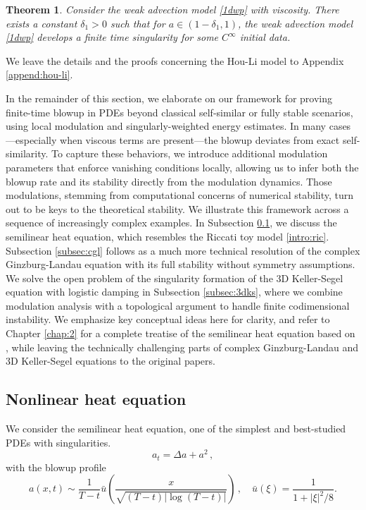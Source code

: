 \documentclass[12pt]{caltech_thesis}
\newtheorem{theorem}{Theorem}[section]
\numberwithin{equation}{section}
\begin{document}
\begin{theorem}
Consider the weak advection model \eqref{1dwp} with viscosity. There exists a constant $\delta_1>0$ such that for $a\in(1-\delta_1,1)$, the weak advection model \eqref{1dwp} develops a finite time singularity for some $C^{\infty}$ initial data.
\end{theorem}
We leave the details and the proofs concerning the Hou-Li model to Appendix \ref{append:hou-li}.

In the remainder of this section, we elaborate on our framework for proving finite-time blowup in PDEs beyond classical self-similar or fully stable scenarios, using local modulation and singularly-weighted energy estimates. In many cases—especially when viscous terms are present—the blowup deviates from exact self-similarity. To capture these behaviors, we introduce additional modulation parameters that enforce vanishing conditions locally, allowing us to infer both the blowup rate and its stability directly from the modulation dynamics. Those modulations, stemming from computational concerns of numerical stability, turn out to be keys to the theoretical stability. 
We illustrate this framework across a sequence of increasingly complex examples. In Subsection \ref{subsec:nlh}, we discuss the semilinear heat equation, which resembles the Riccati toy model \eqref{intro:ric}. Subsection \ref{subsec:cgl} follows as a much more technical resolution of the complex Ginzburg-Landau equation with its full stability without symmetry assumptions. We solve the open problem of the singularity formation of the 3D Keller-Segel equation with logistic damping in Subsection \ref{subsec:3dks}, where we combine modulation analysis with a topological argument to handle finite codimensional instability.  We emphasize key conceptual ideas here for clarity, and refer to Chapter \ref{chap:2} for a complete treatise of the semilinear heat equation based on \cite{hou20242}, while leaving the technically challenging parts of complex Ginzburg-Landau \cite{chen2024stability} and 3D Keller-Segel equations \cite{liu2025finite} to the original papers.
\subsection{Nonlinear heat equation}
\label{subsec:nlh}
We consider the semilinear heat equation, one of the simplest and best-studied PDEs with singularities. 
$$a_t=\Delta a+a^2\,,$$
with the blowup profile\begin{equation*}
a(x, t) \sim \frac{1}{T-t} \bar{u}\left(\frac{x}{\sqrt{(T-t)|\log (T-t)|}}\right)\,, \quad \bar{u}(\xi)=\frac{1}{1+|\xi|^2 / 8}.
\end{equation*}
\end{document}
